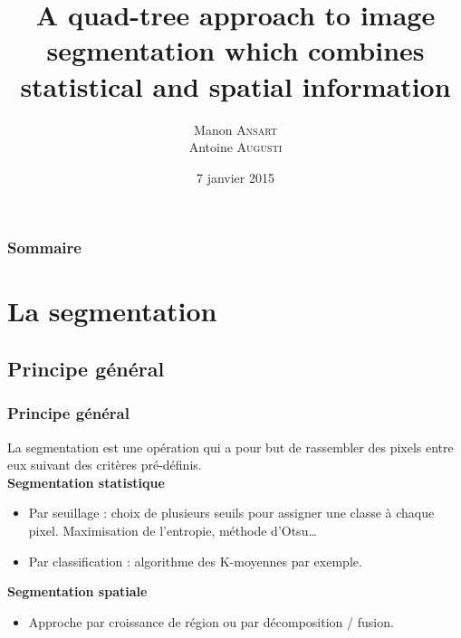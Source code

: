 \documentclass[handout]{beamer}
\title{
	A quad-tree approach to image segmentation which combines statistical and spatial information
}
\author{
	Manon \textsc{Ansart} \\
	\vspace{5px}
	Antoine \textsc{Augusti}
}
\date{7 janvier 2015}
\begin{document}
	\begin{frame}[plain]
		\titlepage
	\end{frame}

	\begin{frame}[plain]
		\frametitle{Sommaire}
		\tableofcontents
	\end{frame}


	\section{La segmentation}

		\subsection{Principe général}
		\begin{frame}
			\frametitle{Principe général}

			La segmentation est une opération qui a pour but de rassembler des pixels entre eux suivant des critères pré-définis.\\
			\vspace{10px}
			\textbf{Segmentation statistique}
			\begin{itemize}
				\item Par seuillage : choix de plusieurs seuils pour assigner une classe à chaque pixel. Maximisation de l'entropie, méthode d'Otsu\dots
				\item Par classification : algorithme des K-moyennes par exemple.
			\end{itemize}

			\vspace{10px}
			\textbf{Segmentation spatiale}
			\begin{itemize}
				\item Approche par croissance de région ou par décomposition / fusion.
			\end{itemize}

		\end{frame}
\end{document}
